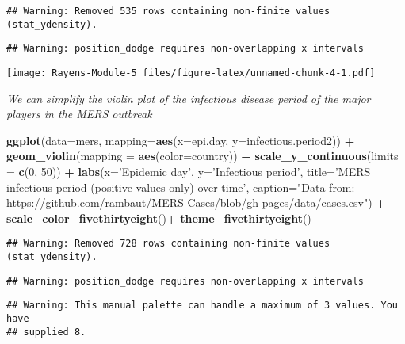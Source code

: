 \documentclass[]{article}
\newenvironment{Shaded}{\begin{snugshade}}{\end{snugshade}}
\newcommand{\DataTypeTok}[1]{\textcolor[rgb]{0.13,0.29,0.53}{#1}}
\newcommand{\DecValTok}[1]{\textcolor[rgb]{0.00,0.00,0.81}{#1}}
\newcommand{\KeywordTok}[1]{\textcolor[rgb]{0.13,0.29,0.53}{\textbf{#1}}}
\newcommand{\NormalTok}[1]{#1}
\newcommand{\OperatorTok}[1]{\textcolor[rgb]{0.81,0.36,0.00}{\textbf{#1}}}
\newcommand{\StringTok}[1]{\textcolor[rgb]{0.31,0.60,0.02}{#1}}
\begin{document}
\begin{verbatim}
## Warning: Removed 535 rows containing non-finite values (stat_ydensity).
\end{verbatim}

\begin{verbatim}
## Warning: position_dodge requires non-overlapping x intervals
\end{verbatim}

\texttt{[image: Rayens-Module-5\_files/figure-latex/unnamed-chunk-4-1.pdf]}

\emph{We can simplify the violin plot of the infectious disease period
of the major players in the MERS outbreak}

\begin{Shaded}
\begin{Highlighting}[]
\KeywordTok{ggplot}\NormalTok{(}\DataTypeTok{data=}\NormalTok{mers, }\DataTypeTok{mapping=}\KeywordTok{aes}\NormalTok{(}\DataTypeTok{x=}\NormalTok{epi.day, }\DataTypeTok{y=}\NormalTok{infectious.period2)) }\OperatorTok{+}\StringTok{ }
\StringTok{  }\KeywordTok{geom_violin}\NormalTok{(}\DataTypeTok{mapping =} \KeywordTok{aes}\NormalTok{(}\DataTypeTok{color=}\NormalTok{country)) }\OperatorTok{+}
\StringTok{  }\KeywordTok{scale_y_continuous}\NormalTok{(}\DataTypeTok{limits =} \KeywordTok{c}\NormalTok{(}\DecValTok{0}\NormalTok{, }\DecValTok{50}\NormalTok{)) }\OperatorTok{+}
\StringTok{   }\KeywordTok{labs}\NormalTok{(}\DataTypeTok{x=}\StringTok{'Epidemic day'}\NormalTok{, }\DataTypeTok{y=}\StringTok{'Infectious period'}\NormalTok{, }\DataTypeTok{title=}\StringTok{'MERS infectious period (positive values only) over time'}\NormalTok{, }\DataTypeTok{caption=}\StringTok{"Data from: https://github.com/rambaut/MERS-Cases/blob/gh-pages/data/cases.csv"}\NormalTok{)  }\OperatorTok{+}
\StringTok{  }\KeywordTok{scale_color_fivethirtyeight}\NormalTok{()}\OperatorTok{+}\StringTok{ }
\StringTok{  }\KeywordTok{theme_fivethirtyeight}\NormalTok{()}
\end{Highlighting}
\end{Shaded}

\begin{verbatim}
## Warning: Removed 728 rows containing non-finite values (stat_ydensity).
\end{verbatim}

\begin{verbatim}
## Warning: position_dodge requires non-overlapping x intervals
\end{verbatim}

\begin{verbatim}
## Warning: This manual palette can handle a maximum of 3 values. You have
## supplied 8.
\end{verbatim}
\end{document}
